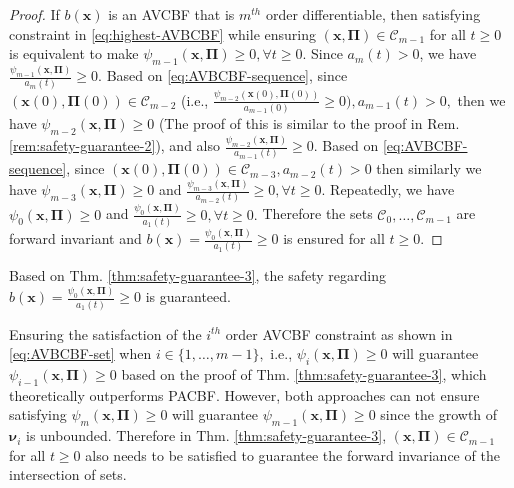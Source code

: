 \begin{proof}
If $b(\boldsymbol{x})$ is an AVCBF that is $m^{th}$ order differentiable, then satisfying constraint in \eqref{eq:highest-AVBCBF} while ensuring $(\boldsymbol{x},\boldsymbol{\Pi})\in \mathcal {C}_{m-1}$ for all $t\ge 0$ is equivalent to make $\psi_{m-1}(\boldsymbol{x},\boldsymbol{\Pi})\ge 0, \forall t\ge 0.$ Since $a_{m}(t)>0$, we have $\frac{\psi_{m-1}(\boldsymbol{x},\boldsymbol{\Pi})}{a_{m}(t)}\ge 0.$ Based on
\eqref{eq:AVBCBF-sequence}, since $(\boldsymbol{x}(0),\boldsymbol{\Pi}(0)) \in \mathcal {C}_{m-2}$ (i.e., $\frac{\psi_{m-2}(\boldsymbol{x}(0),\boldsymbol{\Pi}(0))}{a_{m-1}(0)}\ge 0),a_{m-1}(t)>0,$ then we have $\psi_{m-2}(\boldsymbol{x},\boldsymbol{\Pi})\ge 0$ (The proof of this is similar to the proof in Rem. \ref{rem:safety-guarantee-2}), and also $\frac{\psi_{m-2}(\boldsymbol{x},\boldsymbol{\Pi})}{a_{m-1}(t)}\ge 0.$ Based on \eqref{eq:AVBCBF-sequence}, since $(\boldsymbol{x}(0),\boldsymbol{\Pi}(0)) \in \mathcal {C}_{m-3},a_{m-2}(t)>0$ then similarly we have $\psi_{m-3}(\boldsymbol{x},\boldsymbol{\Pi})\ge 0$ and $\frac{\psi_{m-3}(\boldsymbol{x},\boldsymbol{\Pi})}{a_{m-2}(t)}\ge 0,\forall t\ge 0.$ Repeatedly, we have $\psi_{0}(\boldsymbol{x},\boldsymbol{\Pi})\ge 0$ and $\frac{\psi_{0}(\boldsymbol{x},\boldsymbol{\Pi})}{a_{1}(t)}\ge 0,\forall t\ge 0.$ Therefore the sets $\mathcal {C}_{0},\dots,\mathcal {C}_{m-1}$ are forward invariant and $b(\boldsymbol{x})=\frac{\psi_{0}(\boldsymbol{x},\boldsymbol{\Pi})}{a_{1}(t)}\ge 0$ is ensured for all $t\ge 0$.
\end{proof}
Based on Thm. \ref{thm:safety-guarantee-3}, the safety regarding $b(\boldsymbol{x})=\frac{\psi_{0}(\boldsymbol{x},\boldsymbol{\Pi})}{a_{1}(t)}\ge 0$ is guaranteed.

\begin{remark}
\label{rem: PACBF-AVBCBF} 
Ensuring the satisfaction of the $i^{th}$ order AVCBF constraint as shown in \eqref{eq:AVBCBF-set} when $i\in\{1,\dots,m-1\},$ i.e., $\psi_{i}(\boldsymbol{x},\boldsymbol{\Pi})\ge 0$ will guarantee $\psi_{i-1}(\boldsymbol{x},\boldsymbol{\Pi})\ge 0$ based on the proof of Thm. \ref{thm:safety-guarantee-3}, which theoretically outperforms PACBF. However, both approaches can not ensure satisfying $\psi_{m}(\boldsymbol{x},\boldsymbol{\Pi})\ge 0$ will guarantee $\psi_{m-1}(\boldsymbol{x},\boldsymbol{\Pi})\ge 0$ since the growth of $\boldsymbol{\nu}_{i}$ is unbounded. Therefore in Thm. \ref{thm:safety-guarantee-3}, $(\boldsymbol{x},\boldsymbol{\Pi})\in \mathcal {C}_{m-1}$ for all $t\ge 0$ also needs to be satisfied to guarantee the forward invariance of the intersection of sets. 
\end{remark}

